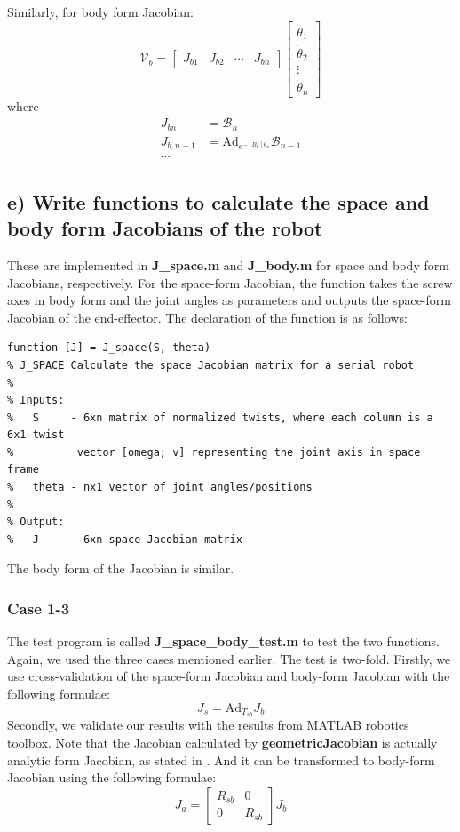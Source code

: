 \documentclass[english,10pt,a4paper]{article}
\begin{document}
    Similarly, for body form Jacobian:
$$\mathcal{V}_b = \begin{bmatrix}
    J_{b1} & J_{b2} & \cdots & J_{bn} 
\end{bmatrix}  \begin{bmatrix}
    \dot{\theta}_1 \\ \dot{\theta}_2 \\ \vdots \\ \dot{\theta}_n
\end{bmatrix}$$
    where 
\begin{align*}
    J_{bn} &= \mathcal{B}_n \\
    J_{b,{n-1}} &= \text{Ad}_{e^{-[B_n]\theta_n}} \mathcal{B}_{n-1} \\
    \cdots
\end{align*}
	
    \subsection*{e) Write functions to calculate the space and body form Jacobians of the robot}
These are implemented in \textbf{J\_space.m} and \textbf{J\_body.m} for space and body form Jacobians, respectively. For the space-form Jacobian, the function takes the screw axes in body form and the joint angles as parameters and outputs the space-form Jacobian of the end-effector. The declaration of the function is as follows:
    \begin{lstlisting}[style=matlab]
function [J] = J_space(S, theta)
% J_SPACE Calculate the space Jacobian matrix for a serial robot
%
% Inputs:
%   S     - 6xn matrix of normalized twists, where each column is a 6x1 twist
%          vector [omega; v] representing the joint axis in space frame
%   theta - nx1 vector of joint angles/positions
%
% Output:
%   J     - 6xn space Jacobian matrix
\end{lstlisting}
    The body form of the Jacobian is similar.
    \subsubsection*{Case 1-3}
    The test program is called \textbf{J\_space\_body\_test.m} to test the two functions. Again, we used the three cases mentioned earlier. The test is two-fold. Firstly, we use cross-validation of the space-form Jacobian and body-form Jacobian with the following formulae:
    \[J_s = \text{Ad}_{T_{sb}} J_b\]
    Secondly, we validate our results with the results from MATLAB robotics toolbox. Note that the Jacobian calculated by \textbf{geometricJacobian} is actually analytic form Jacobian, as stated in \cite{Lynch_Park_2017}. And it can be transformed to body-form Jacobian using the following formulae:
    \[J_a = \begin{bmatrix}
        R_{sb} & 0 \\
        0 & R_{sb}
    \end{bmatrix} J_b\]
\end{document}
